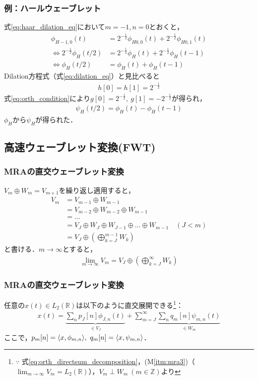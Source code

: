 \documentclass[dvipdfmx,graphicx,14pt]{beamer}
\begin{document}
\begin{frame}[c]
    \frametitle{例：ハールウェーブレット}
    式\eqref{eq:haar_dilation_eq}において$m=-1, n=0$とおくと，
    \begin{align*}
        \phi_{H -1,0}(t) &= 2^{-\frac{1}{2}} \phi_{H 0,0}(t) + 2^{-\frac{1}{2}} \phi_{H 0,1}(t) \\
        \iff 2^{-\frac{1}{2}} \phi_{H}(t/2) &= 2^{-\frac{1}{2}} \phi_{H}(t) + 2^{-\frac{1}{2}} \phi_{H}(t - 1) \\
        \iff \phi_{H}(t/2) &= \phi_{H}(t) + \phi_{H}(t - 1)
    \end{align*}
    Dilation方程式（式\eqref{eq:dilation_eq}）と見比べると
    \begin{align*}
        h[0] = h[1] = 2^{-\frac{1}{2}}
    \end{align*}
    式\eqref{eq:orth_condition}により$g[0] = 2^{-\frac{1}{2}},\ g[1] = -2^{-\frac{1}{2}}$が得られ，
    \begin{align*}
        \psi_{H}(t/2) = \phi_{H}(t) - \phi_{H}(t - 1)
    \end{align*}
    $\phi_{H}$から$\psi_{H}$が得られた．
\end{frame}

\subsection{高速ウェーブレット変換(FWT)}

\begin{frame}[c]
    \frametitle{MRAの直交ウェーブレット変換}
    $V_{m} \oplus W_{m} = V_{m+1}$を繰り返し適用すると，
    \begin{align*}
        V_{m} &= V_{m-1} \oplus W_{m-1} \\
        &= V_{m-2} \oplus W_{m-2} \oplus W_{m-1} \\
        &= ... \\
        &= V_{J} \oplus W_{J} \oplus W_{J-1} \oplus \dots \oplus W_{m-1} \quad (J < m) \\
        &= V_{J} \oplus \left( \bigoplus_{k=J}^{m-1} W_{k} \right)
    \end{align*}
    と書ける．$m\to\infty$とすると，
    \begin{align}
        \lim_{m \to \infty} V_{m} = V_{J} \oplus \left( \bigoplus_{k=J}^{\infty} W_{k} \right) \label{eq:orth_directsum_decomposition}
    \end{align}
\end{frame}

\begin{frame}[c]
    \frametitle{MRAの直交ウェーブレット変換}
    任意の$x(t) \in L_{2}(\mathbb{R})$は以下のように直交展開できる\footnote{$\because$ 式\eqref{eq:orth_directsum_decomposition}，(M\ref{itm:mra3})（$\lim_{m\to\infty} V_{m} = L_{2}(\mathbb{R})$），$V_{m} \perp W_{m}\ (m \in \mathbb{Z})$より}：
    \begin{align}
        x(t) = \underbrace{\sum_{n} p_{J}[n] \phi_{J,n}(t)}_{\in V_{J}} + \sum_{m=J}^{\infty} \underbrace{\sum_{n} q_{m}[n] \psi_{m,n}(t)}_{\in W_{m}} \label{eq:orth_decomp}
    \end{align}
    ここで，$p_{m}[n] = \langle x, \phi_{m,n} \rangle,\ q_{m}[n] = \langle x, \psi_{m,n} \rangle$．
\end{frame}
\end{document}
